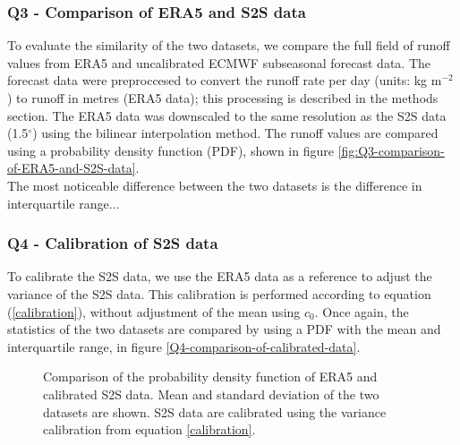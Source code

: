 \documentclass[11pt]{article}
\begin{document}
\subsubsection*{Q3 - Comparison of ERA5 and S2S data}

To evaluate the similarity of the two datasets, we compare the full field of runoff values from ERA5 and uncalibrated ECMWF subseasonal forecast data. The forecast data were preproccesed to convert the runoff rate per day (units: kg m$^{-2}$) to runoff in metres (ERA5 data); this processing is described in the methods section. The ERA5 data was downscaled to the same resolution as the S2S data (1.5$^{\circ}$) using the bilinear interpolation method. The runoff values are compared using a probability density function (PDF), shown in figure \ref*{fig:Q3-comparison-of-ERA5-and-S2S-data}.\\


The most noticeable difference between the two datasets is the difference in interquartile range...

\subsubsection*{Q4 - Calibration of S2S data}

To calibrate the S2S data, we use the ERA5 data as a reference to adjust the variance of the S2S data. This calibration is performed according to equation (\ref{calibration}), without adjustment of the mean using $c_0$. Once again, the statistics of the two datasets are compared by using a PDF with the mean and interquartile range, in figure \ref*{Q4-comparison-of-calibrated-data}.\\

\begin{figure}
\centering
{}
\label{fig:Q4-comparison-of-calibrated-data}
\caption{Comparison of the probability density function of ERA5 and calibrated S2S data. Mean and standard deviation of the two datasets are shown. S2S data are calibrated using the variance calibration from equation \ref*{calibration}.}
\end{figure}
\end{document}
